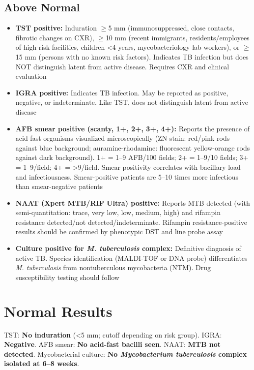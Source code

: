 \subsection*{Above Normal}
\begin{itemize}
  \item \textbf{TST positive:} Induration $\geq$5 mm (immunosuppressed, close contacts, fibrotic changes on CXR), $\geq$10 mm (recent immigrants, residents/employees of high-risk facilities, children <4 years, mycobacteriology lab workers), or $\geq$15 mm (persons with no known risk factors). Indicates TB infection but does NOT distinguish latent from active disease. Requires CXR and clinical evaluation
  \item \textbf{IGRA positive:} Indicates TB infection. May be reported as positive, negative, or indeterminate. Like TST, does not distinguish latent from active disease
  \item \textbf{AFB smear positive (scanty, 1+, 2+, 3+, 4+):} Reports the presence of acid-fast organisms visualized microscopically (ZN stain: red/pink rods against blue background; auramine-rhodamine: fluorescent yellow-orange rods against dark background). 1+ = 1--9 AFB/100 fields; 2+ = 1--9/10 fields; 3+ = 1--9/field; 4+ = >9/field. Smear positivity correlates with bacillary load and infectiousness. Smear-positive patients are 5--10 times more infectious than smear-negative patients
  \item \textbf{NAAT (Xpert MTB/RIF Ultra) positive:} Reports MTB detected (with semi-quantitation: trace, very low, low, medium, high) and rifampin resistance detected/not detected/indeterminate. Rifampin resistance-positive results should be confirmed by phenotypic DST and line probe assay
  \item \textbf{Culture positive for \textit{M. tuberculosis} complex:} Definitive diagnosis of active TB. Species identification (MALDI-TOF or DNA probe) differentiates \textit{M. tuberculosis} from nontuberculous mycobacteria (NTM). Drug susceptibility testing should follow
\end{itemize}

\section*{Normal Results}
TST: \textbf{No induration} (<5 mm; cutoff depending on risk group). IGRA: \textbf{Negative}. AFB smear: \textbf{No acid-fast bacilli seen}. NAAT: \textbf{MTB not detected}. Mycobacterial culture: \textbf{No \textit{Mycobacterium tuberculosis} complex isolated at 6--8 weeks}.

